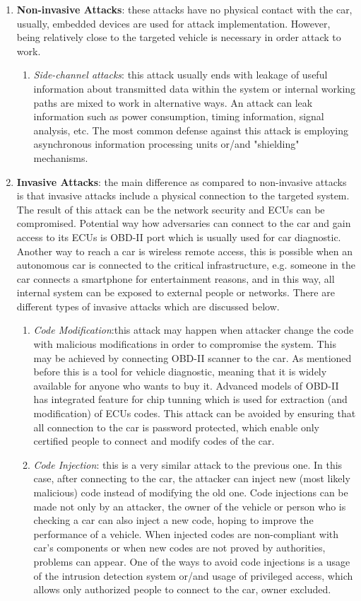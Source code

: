 \begin{enumerate}
	\item \textbf{Non-invasive Attacks}: these attacks have no physical contact with the car, usually, embedded devices are used for attack implementation. However, being relatively close to the targeted vehicle is necessary in order attack to work.
	\begin{enumerate}
		\item \textit{Side-channel attacks}: this attack usually ends with leakage of useful information about transmitted data within the system or internal working paths are mixed to work in alternative ways. An attack can leak information such as power consumption, timing information, signal analysis, etc. The most common defense against this attack is employing asynchronous information processing units or/and "shielding"
		mechanisms.
	\end{enumerate}
	\item \textbf{Invasive Attacks}: the main difference as compared to non-invasive attacks is that invasive attacks include a physical connection to the targeted system. The result of this attack can be the network security and \glspl{ECU} can be compromised. Potential way how adversaries can connect to the car and gain access to its \glspl{ECU} is \gls{OBD-II} port which is usually used for car diagnostic. Another way to reach a car is wireless remote access, this is possible when an autonomous car is connected to the critical infrastructure, e.g. someone in the car connects a smartphone for entertainment reasons, and in this way, all internal system can be exposed to external people or networks. There are different types of invasive attacks which are discussed below.
	\begin{enumerate}
		\item \textit{Code Modification}:this attack may happen when attacker change the code with malicious modifications in order to compromise the system. This may be achieved by connecting \gls{OBD-II} scanner to the car. As mentioned before this is a tool for vehicle diagnostic, meaning that it is widely available for anyone who wants to buy it. Advanced models of \gls{OBD-II} has integrated feature for chip tunning which is used for extraction (and modification) of \glspl{ECU} codes. This attack can be avoided by ensuring that all connection to the car is password protected, which enable only certified people to connect and modify codes of the car.
		\item \textit{Code Injection}: this is a very similar attack to the previous one. In this case, after connecting to the car, the attacker can inject new (most likely malicious) code instead of modifying the old one. Code injections can be made not only by an attacker, the owner of the vehicle or person who is checking a car can also inject a new code, hoping to improve the performance of a vehicle. When injected codes are non-compliant with car's components or when new codes are not proved by authorities, problems can appear. One of the ways to avoid code injections is a usage of the intrusion detection system or/and usage of privileged access, which allows only authorized people to connect to the car, owner excluded.

\end{enumerate}
\end{enumerate}
